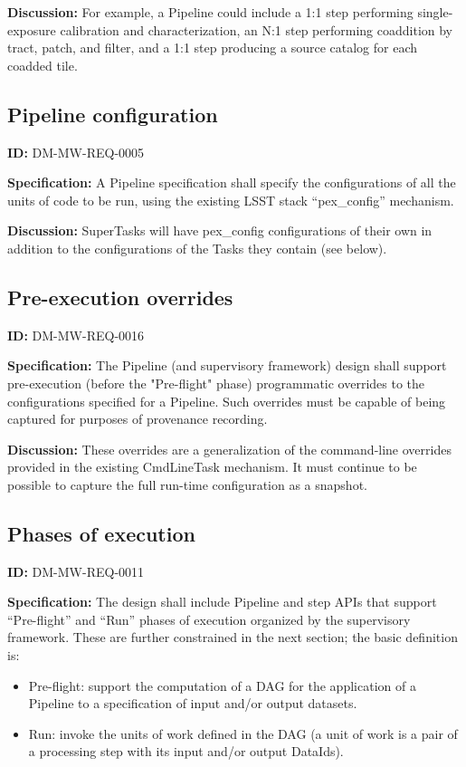 \documentclass[SE,toc,lsstdraft]{lsstdoc}
\begin{document}
\textbf{Discussion:}
For example, a Pipeline could include a 1:1 step performing single-exposure calibration and characterization, an N:1 step performing coaddition by tract, patch, and filter, and a 1:1 step producing a source catalog for each coadded tile.

\subsection{Pipeline configuration}

\label{DM-MW-REQ-0005}
\textbf{ID:} DM-MW-REQ-0005

\textbf{Specification:}
A Pipeline specification shall specify the configurations of all the units of code to be run, using the existing LSST stack “pex\_config” mechanism.

\textbf{Discussion:}
SuperTasks will have pex\_config configurations of their own in addition to the configurations of the Tasks they contain (see below).

\subsection{Pre-execution overrides}

\label{DM-MW-REQ-0016}
\textbf{ID:} DM-MW-REQ-0016

\textbf{Specification:}
The Pipeline (and supervisory framework) design shall support pre-execution (before the "Pre-flight" phase) programmatic overrides to the configurations specified for a Pipeline. Such overrides must be capable of being captured for purposes of provenance recording.

\textbf{Discussion:}
These overrides are a generalization of the command-line overrides provided in the existing CmdLineTask mechanism. It must continue to be possible to capture the full run-time configuration as a snapshot.

\subsection{Phases of execution}

\label{DM-MW-REQ-0011}
\textbf{ID:} DM-MW-REQ-0011

\textbf{Specification:}
The design shall include Pipeline and step APIs that support “Pre-flight” and “Run” phases of execution organized by the supervisory framework. These are further constrained in the next section; the basic definition is:

    \begin{itemize}
\item
Pre-flight: support the computation of a DAG for the application of a Pipeline to a specification of input and/or output datasets.

\item
Run: invoke the units of work defined in the DAG (a unit of work is a pair of a processing step with its input and/or output DataIds).

    \end{itemize}
\end{document}
